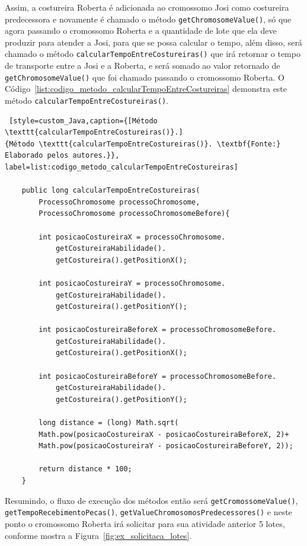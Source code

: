 \par Assim, a costureira Roberta é adicionada ao cromossomo Josi como costureira predecessora e novamente é chamado o método \texttt{getChromosomeValue()}, só que agora passando o cromossomo Roberta e a quantidade de lote que ela deve produzir para 
atender a Josi, para que se possa calcular o tempo, além disso, será chamado o método \texttt{calcularTempoEntreCostureiras()} que irá 
retornar o tempo de transporte entre a Josi e a Roberta, e será somado ao valor retornado de \texttt{getChromosomeValue()} que  
foi chamado passando o cromossomo Roberta. O Código~\ref{list:codigo_metodo_calcularTempoEntreCostureiras} demonstra este método \texttt{calcularTempoEntreCostureiras()}.



\begin{lstlisting} [style=custom_Java,caption={[Método \texttt{calcularTempoEntreCostureiras()}.]
{Método \texttt{calcularTempoEntreCostureiras()}. \textbf{Fonte:} Elaborado pelos autores.}}, label=list:codigo_metodo_calcularTempoEntreCostureiras] 	

	public long calcularTempoEntreCostureiras(
		ProcessoChromosome processoChromosome,
		ProcessoChromosome processoChromosomeBefore){
		
		int posicaoCostureiraX = processoChromosome.
			getCostureiraHabilidade().
			getCostureira().getPositionX();
			
		int posicaoCostureiraY = processoChromosome.
			getCostureiraHabilidade().
			getCostureira().getPositionY();
		
		int posicaoCostureiraBeforeX = processoChromosomeBefore.
			getCostureiraHabilidade().
			getCostureira().getPositionX();
			
		int posicaoCostureiraBeforeY = processoChromosomeBefore.
			getCostureiraHabilidade().
			getCostureira().getPositionY();
		
		long distance = (long) Math.sqrt(
		Math.pow(posicaoCostureiraX - posicaoCostureiraBeforeX, 2)+
		Math.pow(posicaoCostureiraY - posicaoCostureiraBeforeY, 2));
		
		return distance * 100;
	}

\end{lstlisting}

\par Resumindo, o fluxo de execução dos métodos então será \texttt{getCromossomeValue()}, \texttt{getTempoRecebimentoPecas()}, \texttt{getValueChromosomosPredecessores()} e neste ponto o cromossomo Roberta irá solicitar 
para sua atividade anterior 5 lotes, conforme mostra a Figura~\ref{fig:ex_solicitaca_lotes}.

